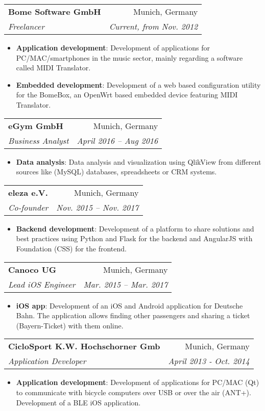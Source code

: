 \documentclass[letterpaper,11pt]{article}
\makeatletter
\newcommand{\resumeItem}[2]{
  \item\small{
    \textbf{#1}{: #2 \vspace{-2pt}}
  }
}
\newcommand{\resumeSubheading}[4]{
  \vspace{-1pt}\item
    \begin{tabular*}{0.97\textwidth}{l@{\extracolsep{\fill}}r}
      \textbf{#1} & #2 \\
      \textit{\small#3} & \textit{\small #4} \\
    \end{tabular*}\vspace{-5pt}
}
\newcommand{\resumeItemListStart}{\begin{itemize}}
\newcommand{\resumeItemListEnd}{\end{itemize}\vspace{-5pt}}
\makeatother
\begin{document}
    \resumeSubheading
      {Bome Software GmbH}{Munich, Germany}
      {Freelancer}{Current, from Nov. 2012}
      \resumeItemListStart
        \resumeItem{Application development}
          {Development of applications for PC/MAC/smartphones in the music sector, mainly regarding a software called MIDI Translator.}
        \resumeItem{Embedded development} 
          {Development of a web based configuration utility for the BomeBox, an OpenWrt based embedded device featuring MIDI Translator.}
      \resumeItemListEnd

    \resumeSubheading
      {eGym GmbH}{Munich, Germany}
      {Business Analyst}{April 2016 -- Aug 2016}
      \resumeItemListStart
        \resumeItem{Data analysis}
          {Data analysis and visualization using QlikView from different sources like (MySQL) databases, spreadsheets or CRM systems.}
    \resumeItemListEnd

    \resumeSubheading
      {eleza e.V.}{Munich, Germany}
      {Co-founder}{Nov. 2015 -- Nov. 2017}
      \resumeItemListStart
        \resumeItem{Backend development}
          {Development of a platform to share solutions and best practices using Python and Flask for the backend and AngularJS with Foundation (CSS) for the frontend.}
    \resumeItemListEnd

    \resumeSubheading
      {Canoco UG}{Munich, Germany}
      {Lead iOS Engineer}{Mar. 2015 -- Mar. 2017}
      \resumeItemListStart
        \resumeItem{iOS app}
          {Development of an iOS and Android application for Deutsche Bahn. The application allows finding other passengers and sharing a ticket (Bayern-Ticket) with them online.}
    \resumeItemListEnd


    \resumeSubheading
      {CicloSport K.W. Hochschorner Gmb}{Munich, Germany}
      {Application Developer}{April 2013 - Oct. 2014}
      \resumeItemListStart
        \resumeItem{Application development}
          {Development of applications for PC/MAC (Qt) to communicate with bicycle computers over USB or over the air (ANT+). Development of a BLE iOS application.}
    \resumeItemListEnd
\end{document}
